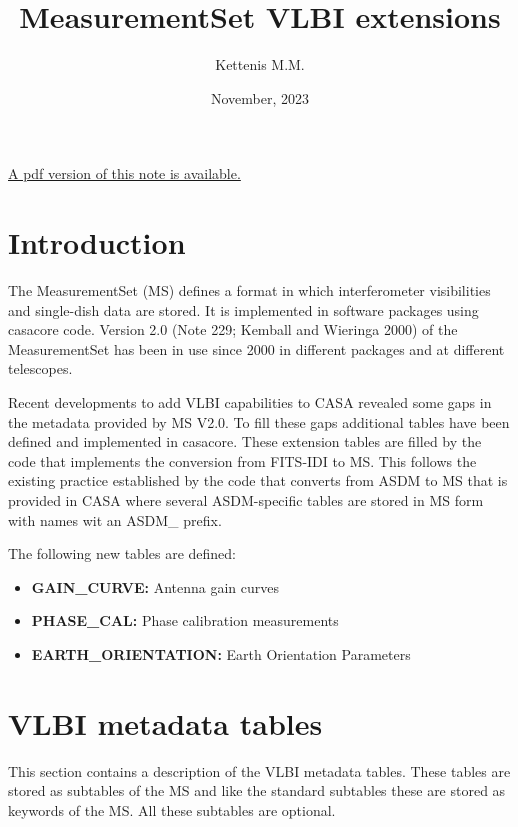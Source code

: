 \documentclass{article}
\begin{document}
\title{MeasurementSet VLBI extensions}

\author{Kettenis M.M.}
\date{November, 2023}
\maketitle

\ifpdf
\else
\href{265.pdf}{A pdf version of this note is available.}
\fi

\tableofcontents 



\section{Introduction}

The MeasurementSet (MS) defines a format in which interferometer
visibilities and single-dish data are stored.  It is implemented in
software packages using casacore code.  Version 2.0 (Note 229; Kemball
and Wieringa 2000) of the MeasurementSet has been in use since 2000 in
different packages and at different telescopes.

Recent developments to add VLBI capabilities to CASA revealed some
gaps in the metadata provided by MS V2.0.  To fill these gaps
additional tables have been defined and implemented in casacore.
These extension tables are filled by the code that implements the
conversion from FITS-IDI to MS.  This follows the existing practice
established by the code that converts from ASDM to MS that is provided
in CASA where several ASDM-specific tables are stored in MS form with
names wit an ASDM\_ prefix.

The following new tables are defined:

\begin{itemize}

\item{{\bf GAIN\_CURVE:} Antenna gain curves}

\item{{\bf PHASE\_CAL:} Phase calibration measurements}

\item{{\bf EARTH\_ORIENTATION:} Earth Orientation Parameters}

\end{itemize}


\section{VLBI metadata tables}

This section contains a description of the VLBI metadata tables.
These tables are stored as subtables of the MS and like the standard
subtables these are stored as keywords of the MS.  All these subtables
are optional.
\end{document}
